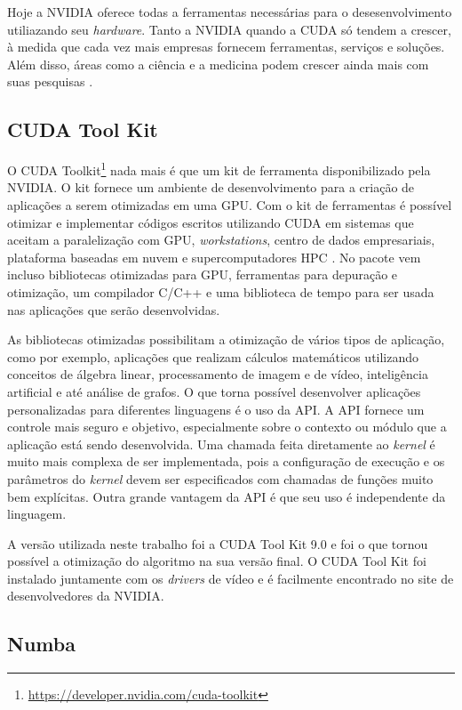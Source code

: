 \documentclass[
	12pt,				%
	twoside,			%
	a4paper,			%
	english,			%
	french,				%
	spanish,			%
	brazil				%
	]{abntex2}
\begin{document}
Hoje a NVIDIA oferece todas a ferramentas necessárias para o
desesenvolvimento utiliazando seu \emph{hardware}. Tanto a NVIDIA quando
a CUDA só tendem a crescer, à medida que cada vez mais empresas fornecem
ferramentas, serviços e soluções. Além disso, áreas como a ciência e a
medicina podem crescer ainda mais com suas pesquisas \cite{CUDA}.

\subsection{CUDA Tool Kit}\label{cuda-tool-kit}

O CUDA Toolkit\footnote{\url{https://developer.nvidia.com/cuda-toolkit}}
nada mais é que um kit de ferramenta disponibilizado pela NVIDIA. O kit
fornece um ambiente de desenvolvimento para a criação de aplicações a
serem otimizadas em uma GPU. Com o kit de ferramentas é possível
otimizar e implementar códigos escritos utilizando CUDA em sistemas que
aceitam a paralelização com GPU, \emph{workstations}, centro de dados
empresariais, plataforma baseadas em nuvem e supercomputadores HPC
\cite{TOOLKIT}. No pacote vem incluso bibliotecas otimizadas para GPU,
ferramentas para depuração e otimização, um compilador C/C++ e uma
biblioteca de tempo para ser usada nas aplicações que serão
desenvolvidas.

As bibliotecas otimizadas possibilitam a otimização de vários tipos de
aplicação, como por exemplo, aplicações que realizam cálculos
matemáticos utilizando conceitos de álgebra linear, processamento de
imagem e de vídeo, inteligência artificial e até análise de grafos. O
que torna possível desenvolver aplicações personalizadas para diferentes
linguagens é o uso da API. A API fornece um controle mais seguro e
objetivo, especialmente sobre o contexto ou módulo que a aplicação está
sendo desenvolvida. Uma chamada feita diretamente ao \emph{kernel} é
muito mais complexa de ser implementada, pois a configuração de execução
e os parâmetros do \emph{kernel} devem ser especificados com chamadas de
funções muito bem explícitas. Outra grande vantagem da API é que seu uso
é independente da linguagem.

A versão utilizada neste trabalho foi a CUDA Tool Kit 9.0 e foi o que
tornou possível a otimização do algoritmo na sua versão final. O CUDA
Tool Kit foi instalado juntamente com os \emph{drivers} de vídeo e é
facilmente encontrado no site de desenvolvedores da NVIDIA.

\subsection{Numba}\label{numba}
\end{document}
